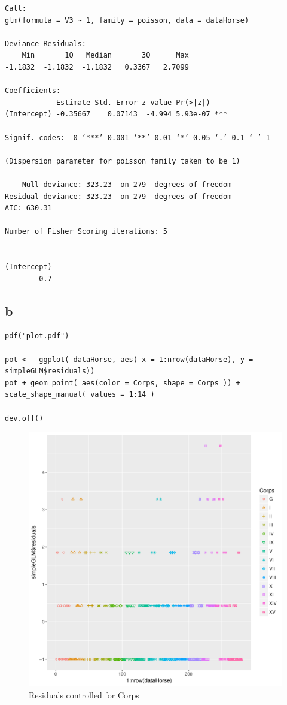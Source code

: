 \documentclass[11pt]{article}
\begin{document}
\begin{verbatim}
Call:
glm(formula = V3 ~ 1, family = poisson, data = dataHorse)

Deviance Residuals: 
    Min       1Q   Median       3Q      Max  
-1.1832  -1.1832  -1.1832   0.3367   2.7099  

Coefficients:
            Estimate Std. Error z value Pr(>|z|)    
(Intercept) -0.35667    0.07143  -4.994 5.93e-07 ***
---
Signif. codes:  0 ‘***’ 0.001 ‘**’ 0.01 ‘*’ 0.05 ‘.’ 0.1 ‘ ’ 1

(Dispersion parameter for poisson family taken to be 1)

    Null deviance: 323.23  on 279  degrees of freedom
Residual deviance: 323.23  on 279  degrees of freedom
AIC: 630.31

Number of Fisher Scoring iterations: 5


(Intercept) 
        0.7 
\end{verbatim}



\subsection{b}
\label{sec-1-2}
\begin{verbatim}
pdf("plot.pdf")

pot <-  ggplot( dataHorse, aes( x = 1:nrow(dataHorse), y = simpleGLM$residuals))
pot + geom_point( aes(color = Corps, shape = Corps )) + scale_shape_manual( values = 1:14 )

dev.off()
\end{verbatim}

\begin{figure}[htb]
\centering
\includegraphics[width=.9\linewidth]{./plot.pdf}
\caption{Residuals controlled for Corps}
\end{figure}
\end{document}
